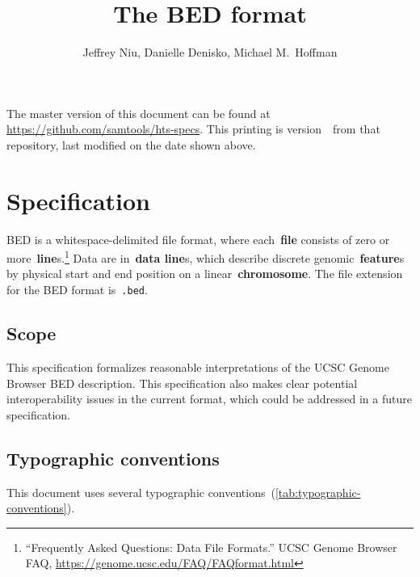 \documentclass[11pt]{article}
\title{The \acf{BED} format}
\author{Jeffrey Niu, Danielle Denisko, Michael M.~Hoffman}
\date{\headdate}
\providecommand*{\Ac}[1]{\ac{#1}} %
\begin{document}
\maketitle

\begin{small}
\noindent
The master version of this document can be found at \url{https://github.com/samtools/hts-specs}.
This printing is version~\commitdesc\ from that repository, last modified on the date shown above.
\end{small}


\section{Specification}

\Ac{BED} is a whitespace-delimited file format, where each~\textbf{file} consists of zero or more~\textbf{line}s.\footnote{``Frequently Asked Questions: Data File Formats.'' \ac{UCSC} Genome Browser FAQ, \url{https://genome.ucsc.edu/FAQ/FAQformat.html}}
Data are in~\textbf{data line}s, which describe discrete genomic~\textbf{feature}s by physical start and end position on a linear~\textbf{chromosome}.
The file extension for the \ac{BED} format is~\texttt{.bed}.

\subsection{Scope}

This specification formalizes reasonable interpretations of the \ac{UCSC} Genome Browser \ac{BED} description.
This specification also makes clear potential interoperability issues in the current format, which could be addressed in a future specification.

\subsection{Typographic conventions}

This document uses several typographic conventions~(\autoref{tab:typographic-conventions}).
\end{document}
